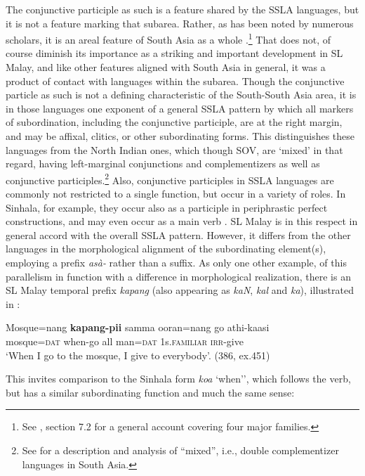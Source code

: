 The conjunctive participle as such is a feature shared by the SSLA languages, but it is not a feature marking that subarea. Rather, as has been noted by numerous scholars, it is an areal feature of South Asia as a whole \citep{Emeneau1956,Masica1976}.\footnote{See
  \citet{Subbaraoinpress}, section 7.2 for a general account covering four major families.
} 
That does not, of course diminish its importance as a striking and important development in SL Malay, and like other features aligned with South Asia in general, it was a product of contact with languages within the subarea. 
Though the conjunctive particle as such is not a defining characteristic of the South-South Asia area, it is in those languages one exponent of a general SSLA pattern by which all markers of subordination, including the conjunctive participle, are at the right margin, and may be affixal, clitics, or other subordinating forms. This distinguishes these languages from the North Indian ones, which though SOV, are `mixed' in that regard, having left-marginal conjunctions and complementizers as well as conjunctive participles.\footnote{See
  \citet{Bayer2001} for a description and analysis of ``mixed'', i.e., double complementizer languages in South Asia.
} 
Also, conjunctive participles in SSLA languages are commonly not restricted to a single function, but occur in a variety of roles. In Sinhala, for example, they occur also as a participle in periphrastic perfect constructions, and may even occur as a main verb \citep{Gair2005}.
SL Malay is in this respect in general accord with the overall SSLA pattern. However, it differs from the other languages in the morphological alignment of the subordinating element(s), employing a prefix \textit{asà-} rather than a suffix. As only one other example, of this parallelism in function with a difference in morphological realization, there is an SL Malay temporal prefix \textit{kapang} (also appearing as \textit{kaN}, \textit{kal} and \textit{ka}), illustrated in : 


\ea\label{ex3.2.3} 
\gll Mosque=nang \textbf{kapang-pii} samma ooran=nang go athi-kaasi\\
   mosque=\textsc{dat}  when-go   all man=\textsc{dat} 1s.\textsc{familiar}      \textsc{irr}-give\\
    `When I go to the mosque, I give to everybody'. (386, ex.451)
\z


  This invites comparison to the Sinhala form \textit{ko{\dott}a} `when'', which follows the verb, but has a similar subordinating function and much the same sense:


